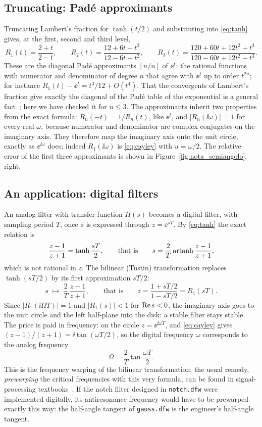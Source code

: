 \subsection{Truncating: Pad\'e approximants}

Truncating Lambert's fraction for $\tanh(t/2)$ and substituting into
\eqref{eq:tanh} gives, at the first, second and third level,
\[
  R_1(t)=\frac{2+t}{2-t},\qquad
  R_2(t)=\frac{12+6t+t^2}{12-6t+t^2},\qquad
  R_3(t)=\frac{120+60t+12t^2+t^3}{120-60t+12t^2-t^3}.
\]
These are the diagonal Pad\'e approximants $[n/n]$ of $\ee^{t}$: the
rational functions with numerator and denominator of degree $n$ that agree
with $\ee^{t}$ up to order $t^{2n}$; for instance
$R_1(t)-\ee^{t}=t^3/12+O(t^4)$. That the convergents of Lambert's fraction
give exactly the diagonal of the Pad\'e table of the exponential is a general
fact~\cite{baker1996}; here we have checked it for $n\le3$. The approximants
inherit two properties from the exact formula: $R_n(-t)=1/R_n(t)$, like
$\ee^{t}$, and $|R_n(\ii\omega)|=1$ for every real $\omega$, because
numerator and denominator are complex conjugates on the imaginary axis. They
therefore map the imaginary axis onto the unit circle, exactly as
$\ee^{\ii\omega}$ does; indeed $R_1(\ii\omega)$ is \eqref{eq:cayley} with
$u=\omega/2$. The relative error of the first three approximants is shown in
Figure~\ref{fig:nota_semiangolo}, right.

\subsection{An application: digital filters}

An analog filter with transfer function $H(s)$ becomes a digital filter, with
sampling period $T$, once $s$ is expressed through $z=\ee^{sT}$. By
\eqref{eq:tanh} the exact relation is
\[
  \frac{z-1}{z+1}=\tanh\frac{sT}{2},
  \qquad\text{that is}\qquad
  s=\frac2T\operatorname{artanh}\frac{z-1}{z+1},
\]
which is not rational in $z$. The bilinear (Tustin) transformation replaces
$\tanh(sT/2)$ by its first approximation $sT/2$:
\[
  s\;\mapsto\;\frac2T\,\frac{z-1}{z+1},
  \qquad\text{that is}\qquad
  z=\frac{1+sT/2}{1-sT/2}=R_1(sT).
\]
Since $|R_1(\ii\Omega T)|=1$ and $|R_1(s)|<1$ for $\operatorname{Re} s<0$, the imaginary
axis goes to the unit circle and the left half-plane into the disk: a stable
filter stays stable. The price is paid in frequency: on the circle
$z=\ee^{\ii\omega T}$, and \eqref{eq:cayley} gives
$(z-1)/(z+1)=\ii\tan(\omega T/2)$, so the digital frequency $\omega$
corresponds to the analog frequency
\[
  \Omega=\frac2T\tan\frac{\omega T}{2}.
\]
This is the frequency warping of the bilinear transformation; the usual
remedy, \emph{prewarping} the critical frequencies with this very formula,
can be found in signal-processing textbooks~\cite{oppenheim2010}. If the
notch filter designed in \texttt{notch.dfw} were implemented digitally, its
antiresonance frequency would have to be prewarped exactly this way: the
half-angle tangent of \texttt{gauss.dfw} is the engineer's half-angle
tangent.

